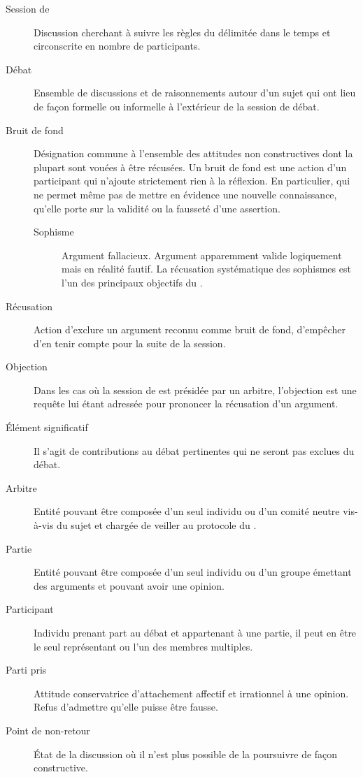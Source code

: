 \begin{description}
  \item[Session de \mainabbr{}] Discussion cherchant à suivre les règles du \mainabbr{} délimitée dans le temps et circonscrite en nombre de participants.
  \item[Débat] Ensemble de discussions et de raisonnements autour d’un sujet qui ont lieu de façon formelle ou informelle à l’extérieur de la session de débat.
  \item[Bruit de fond] Désignation commune à l’ensemble des attitudes non constructives dont la plupart sont vouées à être récusées. Un bruit de fond est une action d’un participant qui n’ajoute strictement rien à la réflexion. En particulier, qui ne permet même pas de mettre en évidence une nouvelle connaissance, qu’elle porte sur la validité ou la fausseté d’une assertion.

    \begin{description}
      \item[Sophisme] Argument fallacieux. Argument apparemment valide logiquement mais en réalité fautif. La récusation systématique des sophismes est l’un des principaux objectifs du \mainabbr{}.
    \end{description}

  \item[Récusation] Action d’exclure un argument reconnu comme bruit de fond, d’empêcher d’en tenir compte pour la suite de la session.
  \item[Objection] Dans les cas où la session de \mainabbr{} est présidée par un arbitre, l’objection est une requête lui étant adressée pour prononcer la récusation d’un argument.
  \item[Élément significatif] Il s’agit de contributions au débat pertinentes  qui ne seront pas exclues du débat.
  \item[Arbitre] Entité pouvant être composée d’un seul individu ou d’un comité neutre vis-à-vis du sujet et chargée de veiller au protocole du \mainabbr{}.
  \item[Partie] Entité pouvant être composée d’un seul individu ou d’un groupe émettant des arguments et pouvant avoir une opinion.
  \item[Participant] Individu prenant part au débat et appartenant à une partie, il peut en être le seul représentant ou l’un des membres multiples.
  \item[Parti pris] Attitude conservatrice d’attachement affectif et irrationnel à une opinion. Refus d’admettre qu’elle puisse être fausse.
  \item[Point de non-retour] État de la discussion où il n’est plus possible de la poursuivre de façon constructive.
\end{description}

